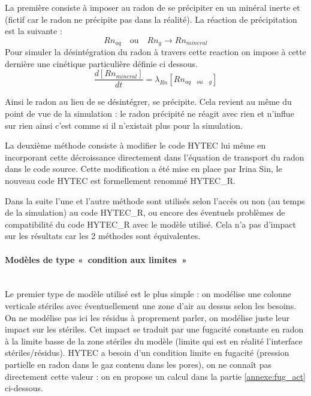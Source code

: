 \documentclass{article}
\begin{document}
La première consiste à imposer au radon de se précipiter en un minéral inerte et (fictif car le radon ne précipite pas dans la réalité). La réaction de précipitation est la suivante :
$$Rn_{aq} \quad \text{ou} \quad Rn_{g} \rightarrow Rn_{mineral}$$
Pour simuler la désintégration du radon à travers cette reaction on impose à cette dernière une cinétique particulière définie ci dessous. 
$$ \frac{d\left[ Rn_{mineral} \right]}{dt}=\lambda_{Rn} \left[ Rn_{aq \quad ou \quad g} \right] $$

Ainsi le radon au lieu de se désintégrer, se précipite. Cela revient au même du point de vue de la simulation : le radon précipité ne réagit avec rien et n'influe sur rien ainsi c'est comme si il n'existait plus pour la simulation.

La deuxième méthode consiste à modifier le code HYTEC lui même en incorporant cette décroissance directement dans l'équation de transport du radon dans le code source. Cette modification a été mise en place par Irina Sin, le nouveau code HYTEC est formellement renommé HYTEC\_R.

Dans la suite l'une et l'autre méthode sont utilisés selon l'accès ou non (au temps de la simulation) au code HYTEC\_R, ou encore des éventuels problèmes de compatibilité du code HYTEC\_R avec le modèle utilisé. Cela n'a pas d'impact sur les résultats car les 2 méthodes sont équivalentes.

\paragraph{Modèles de type « condition aux limites » \\ \\} Le premier type de modèle utilisé est le plus simple : on modélise une colonne verticale stériles avec éventuellement une zone d'air au dessus selon les besoins. On ne modélise pas ici les résidus à proprement parler, on modélise juste leur impact sur les stériles. Cet impact se traduit par une fugacité constante en radon à la limite basse de la zone stériles du modèle (limite qui est en réalité l'interface stériles/résidus). HYTEC a besoin d'un condition limite en fugacité (pression partielle en radon dans le gaz contenu dans les pores), on ne connaît pas directement cette valeur : on en propose un calcul dans la partie \ref{annexe:fug_act} ci-dessous.
\end{document}
